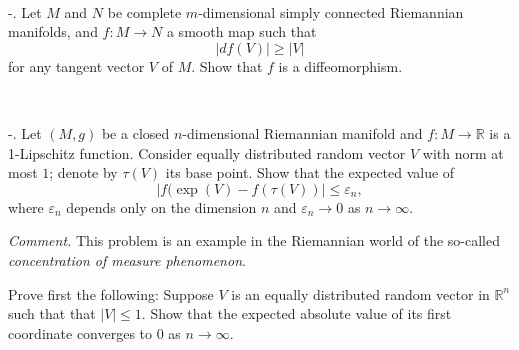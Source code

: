 \documentclass[a4paper,10pt]{article}
\def\RR{\mathbb{R}}%
\def\eps{\varepsilon}%
\def\:{\colon}
\begin{document}
\ 

-. Let $M$ and $N$ be complete $m$-dimensional simply connected Riemannian manifolds, and $f\:M\to N$ a smooth map such that 
$$|df(V)|\ge |V|$$
for any tangent vector $V$ of $M$.
Show that $f$ is a diffeomorphism.

\ 

-. Let $(M,g)$ be a closed $n$-dimensional Riemannian manifold and $f\:M\to\RR$ is a 1-Lipschitz function.
Consider equally distributed random vector $V$ with norm at most $1$; denote by $\tau(V)$ its base point.
Show that the expected value of 
\[|f(\exp(V)-f(\tau(V))|\le \eps_n,\] 
where $\eps_n$ depends only on the dimension $n$ and $\eps_n\to 0$ as $n\to\infty$.


\medskip
\noindent\textit{Comment.}
This problem  is an example in the Riemannian world of the so-called 
\emph{concentration of measure phenomenon}.

Prove first the following: Suppose $V$ is an equally distributed random vector in $\RR^n$ such that that $|V|\le 1$.
Show that the expected absolute value of its first coordinate converges to 0 as $n\to \infty$.
\end{document}
